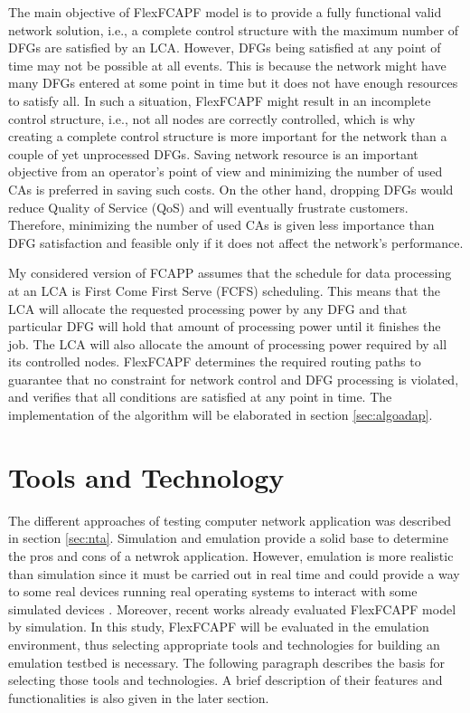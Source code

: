 The main objective of FlexFCAPF model is to provide a fully functional valid network solution, i.e., a complete control structure with the maximum number of DFGs are satisfied by an LCA. However, DFGs being satisfied at any point of time may not be possible at all events. This is because the network might have many DFGs entered at some point in time but it does not have enough resources to satisfy all. In such a situation, FlexFCAPF might result in an incomplete control structure, i.e., not all nodes are correctly controlled, which is why creating a complete control structure is more important for the network than a couple of yet unprocessed DFGs. Saving network resource is an important objective from an operator's point of view and minimizing the number of used CAs is preferred in saving such costs. On the other hand, dropping DFGs would reduce Quality of Service (QoS) and will eventually frustrate customers. Therefore, minimizing the number of used CAs is given less importance than DFG satisfaction and feasible only if it does not affect the network's performance.

My considered version of FCAPP assumes that the schedule for data processing at an LCA is First Come First Serve (FCFS) scheduling. This means that the LCA will allocate the requested processing power by any DFG and that particular DFG will hold that amount of processing power until it finishes the job. The LCA will also allocate the amount of processing power required by all its controlled nodes. FlexFCAPF determines the required routing paths to guarantee that no constraint for network control and DFG processing is violated, and verifies that all conditions are satisfied at any point in time. The implementation of the algorithm will be elaborated in section \ref{sec:algoadap}.

\section{Tools and Technology}\label{sec:tools}
The different approaches of testing computer network application was described in section \ref{sec:nta}. Simulation and emulation provide a solid base to determine the pros and cons of a netwrok application. However, emulation is more realistic than simulation since it must be carried out in real time and could provide a way to some real devices running real operating systems to interact with some simulated devices \cite{6588659}. Moreover, recent works \cite{7343600} already evaluated FlexFCAPF model by simulation. In this study, FlexFCAPF will be evaluated in the emulation environment, thus selecting appropriate tools and technologies for building an emulation testbed is necessary. The following paragraph describes the basis for selecting those tools and technologies. A brief description of their features and functionalities is also given in the later section.

